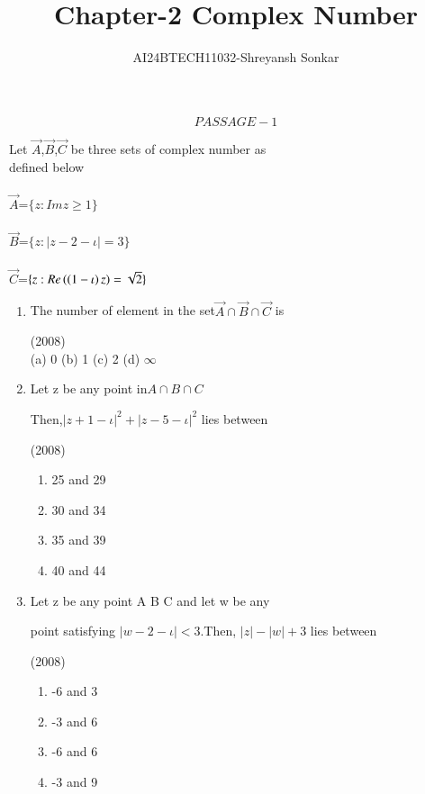 \documentclass[journal,12pt,twocolumn]{IEEEtran}
\theoremstyle{remark}
\begin{document}

\vspace{3cm}

\title{Chapter-2 Complex Number}
\author{AI24BTECH11032-Shreyansh Sonkar
}
\maketitle
\newpage
\bigskip

\renewcommand{\thefigure}{\theenumi}
\renewcommand{\thetable}{\theenumi}
$$PASSAGE-1$$

    


 Let $\vec{A}$,$\vec{B}$,$\vec{C}$ be three sets of complex number as\\ 
  defined below\\\\
$\vec{A}$=$\{z:Im z\geq 1\}$\\\\
$\vec{B}$=$\{z:|z-2-\iota|=3\}$\\\\
$\vec{C}$=$\{z:Re\left(\left(1-\iota\right)z\right)=\sqrt{2}\}$\\
\begin{enumerate}
        
\item The number of element in the set$\vec{A} \cap\vec{B} \cap\vec{C} $
is 

\hfill (2008)\\
 
   (a) 0 \hfill
   (b) 1 \hfill
   (c) 2 \hfill
   (d) $\infty$

 

\item Let z be any point in$ A\cap B \cap C$

 Then,$|z+1-\iota|^2+|z-5-\iota|^2$ lies between
 
 \hfill  (2008) \\
\begin{multicols}{2}
    \begin{enumerate}
        \item 25 and 29
        \item 30 and 34
        \item 35 and 39
        \item 40 and 44
    \end{enumerate}
\end{multicols}

\item  Let z be any point A B C and let w be any

point satisfying $|w-2-\iota|<3$.Then, $|z|-|w|+3$ lies between
   
   \hfill (2008) \\
 \begin{multicols}{2}
  \begin{enumerate}
    \item -6 and 3
    \item -3 and 6 
    \item -6 and 6
    \item -3 and 9
  \end{enumerate}
 \end{multicols}

 
 
\end{enumerate}
 
\end{document}
